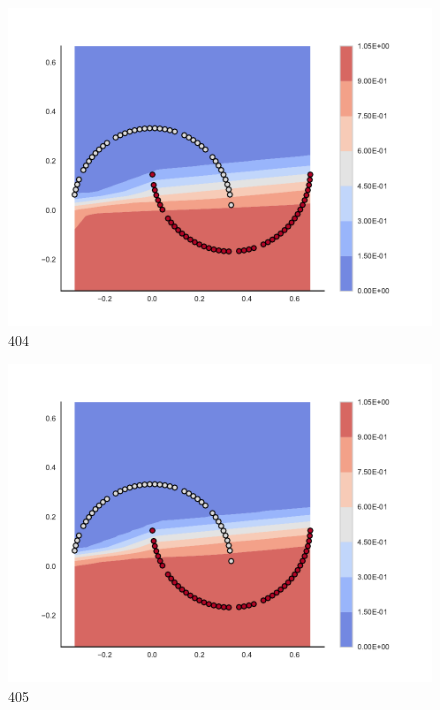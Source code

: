 \begin{subfigure}[b]{0.09\textwidth}
    \includegraphics[clip, trim=2.35cm 1.75cm 4.5cm 0cm,width=\textwidth]{img/convergence/404.pdf}
    \caption{404}
    \label{fig:convergence_404}
\end{subfigure}
%
\begin{subfigure}[b]{0.09\textwidth}
    \includegraphics[clip, trim=2.35cm 1.75cm 4.5cm 0cm,width=\textwidth]{img/convergence/405.pdf}
    \caption{405}
    \label{fig:convergence_405}
\end{subfigure}
%

